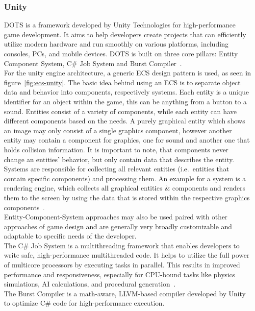 \subsubsection{Unity}\label{subsubsec:entity-component-system}
\gls{DOTS} is a framework developed by Unity Technologies for high-performance game development.
It aims to help developers create projects that can efficiently utilize modern hardware and run smoothly on various platforms,
including consoles, PCs, and mobile devices.
DOTS is built on three core pillars: Entity Component System, C\# Job System and Burst Compiler~\cite{dots}.
\\
For the unity engine architecture, a generic \gls{ECS} design pattern is used, as seen in figure~\ref{fig:ecs-unity}.
The basic idea behind using an ECS is to separate object data and behavior into components, respectively systems.
Each entity is a unique identifier for an object within the game, this can be anything from a button to a sound.
Entities consist of a variety of components, while each entity can have different components based on the needs.
A purely graphical entity which shows an image may only consist of a single graphics component, however another entity may contain
a component for graphics, one for sound and another one that holds collision information.
It is important to note, that components never change an entities' behavior, but only contain data that describes the entity.
Systems are responsible for collecting all relevant entities (i.e.\ entities that contain specific components) and processing them.
An example for a system is a rendering engine, which collects all graphical entities \& components and renders them to the screen by
using the data that is stored within the respective graphics components~\cite{dots}.
\\
Entity-Component-System approaches may also be used paired with other approaches of game design and are generally very broadly customizable and adaptable
to specific needs of the developer.
\\
The C\# Job System is a multithreading framework that enables developers to write safe, high-performance multithreaded code.
It helps to utilize the full power of multicore processors by executing tasks in parallel.
This results in improved performance and responsiveness, especially for \gls{CPU}-bound tasks like physics simulations, AI calculations, and procedural generation~\cite{dots}.
\\
The Burst Compiler is a math-aware, \gls{LLVM}-based compiler developed by Unity to optimize C\# code for high-performance execution.
